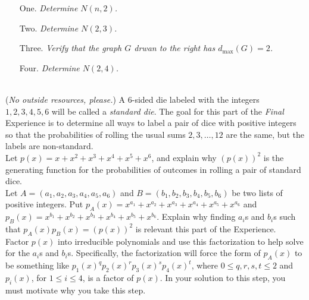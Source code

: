 \documentclass{article}
\begin{document}
\begin{multicols}{2}
\begin{enumerate}
\item[One.] \emph{Determine $N(n,2)$.}
\item[Two.] \emph{Determine $N(2,3)$.}
\item[Three.] \emph{Verify that the graph $G$ drwan to the right has $d_{\mathrm{max}}(G) =2$.}
\item[Four.] \emph{Determine $N(2,4)$.}
\end{enumerate}
\end{multicols}
\vspace{2em}
\noindent \underline{\hspace{5in}}
\newpage
\vspace{2em}
\\
\noindent(\emph{No outside resources, please.}) A 6-sided die labeled with the integers $1, 2, 3, 4, 5, 6$ will be called a \emph{standard die}.  The goal for this part of the \emph{Final} Experience is to determine all ways to label a pair of dice with positive integers so that the probabilities of rolling the usual sums $2, 3, \dots ,12$ are the same, but the labels are non-standard.  \\
  Let $p(x) = x+x^2+x^3+x^4+x^5+x^6$, and explain why $(p(x))^2$ is the generating function for the probabilities of outcomes in rolling a pair of standard dice.\\
  Let $A =(a_1, a_2, a_3, a_4, a_5, a_6)$ and $B = (b_1, b_2, b_3, b_4, b_5, b_6)$ be two lists of positive integers.  Put $p_A(x) = x^{a_1}+x^{a_2} + x^{a_3} + x^{a_4}+x^{a_5} + x^{a_6}$ and $p_B(x) = x^{b_1}+x^{b_2}+x^{b_3}+x^{b_4}+x^{b_5}+x^{b_6}$.  Explain why finding $a_i$s and $b_i$s such that $p_A(x)p_B(x) = (p(x))^2$ is relevant this part of the Experience.\\
  Factor $p(x)$ into irreducible polynomials and use this factorization to help solve for the $a_i$s and $b_i$s. Specifically, the factorization will force the form of $p_A(x)$ to be something like $p_1(x)^qp_2(x)^rp_3(x)^sp_4(x)^t$, where $0 \leq q,r,s,t \leq 2$ and $p_i(x)$, for $1 \leq i \leq 4$, is a factor of $p(x)$.  In your solution to this step, you must motivate why you take this step. \\
\end{document}

